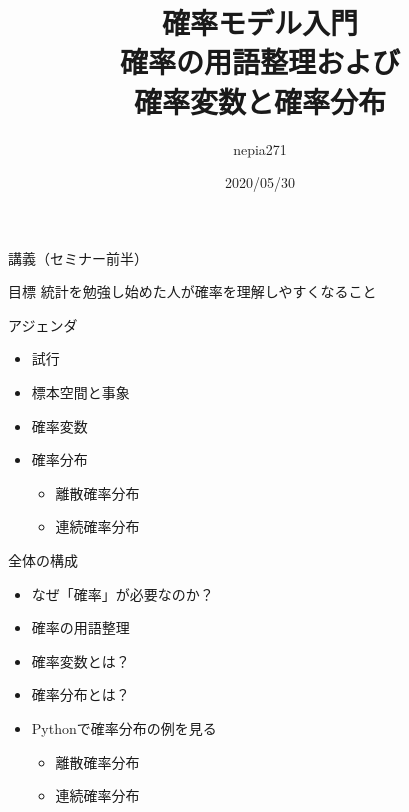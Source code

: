 \documentclass[dvipdfmx,cjk]{beamer}
\title{確率モデル入門\\確率の用語整理および\\確率変数と確率分布}
\author{nepia271}
\institute{Liberal Arts for Tech}
\date{2020/05/30}
\begin{document}
\begin{frame}
  \titlepage
\end{frame}




\begin{frame}{講義（セミナー前半）}

\begin{block}{目標}
    統計を勉強し始めた人が確率を理解しやすくなること
\end{block}

\vskip 1cm

\begin{block}{アジェンダ}
    \begin{itemize}
    \item 試行
    \item 標本空間と事象
    \item 確率変数
    \item 確率分布
        \begin{itemize}
        \item 離散確率分布
        \item 連続確率分布
        \end{itemize}
    \end{itemize}
\end{block}

\end{frame}


\begin{frame}{全体の構成}

\begin{itemize}
    \item なぜ「確率」が必要なのか？
    \item 確率の用語整理
    \item 確率変数とは？
    \item 確率分布とは？
    \item Pythonで確率分布の例を見る
        \begin{itemize}
        \item 離散確率分布
        \item 連続確率分布
        \end{itemize}
\end{itemize}

\end{frame}
\end{document}
